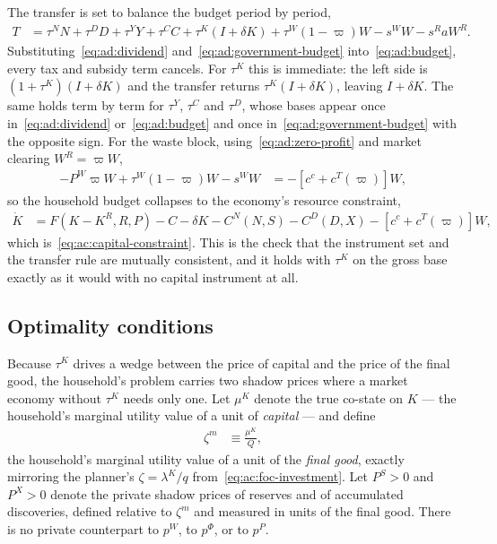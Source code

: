  The transfer is set to balance the budget period by period,
\begin{align}
T &= \tau^NN+\tau^DD+\tau^YY+\tau^CC+\tau^K\left(I+\delta K\right)+\tau^W(1-\varpi)W-s^WW-s^R aW^R.
\label{eq:ad:government-budget}
\end{align}
Substituting~\eqref{eq:ad:dividend} and~\eqref{eq:ad:government-budget} into~\eqref{eq:ad:budget}, every tax and subsidy term cancels. For $\tau^K$ this is immediate: the left side is $\left(1+\tau^K\right)\left(I+\delta K\right)$ and the transfer returns $\tau^K\left(I+\delta K\right)$, leaving $I+\delta K$. The same holds term by term for $\tau^Y$, $\tau^C$ and $\tau^D$, whose bases appear once in~\eqref{eq:ad:dividend} or~\eqref{eq:ad:budget} and once in~\eqref{eq:ad:government-budget} with the opposite sign. For the waste block, using~\eqref{eq:ad:zero-profit} and market clearing $W^R=\varpi W$,
\begin{align}
-P^W\varpi W+\tau^W(1-\varpi)W-s^WW &= -\left[c^c+c^T(\varpi)\right]W,
\label{eq:ad:waste-cancellation}
\end{align}
so the household budget collapses to the economy's resource constraint,
\begin{align}
\dot K &= F\!\left(K-K^R,R,P\right)-C-\delta K-C^N(N,S)-C^D(D,X)-\left[c^c+c^T(\varpi)\right]W,
\label{eq:ad:resource-constraint}
\end{align}
which is~\eqref{eq:ac:capital-constraint}. This is the check that the instrument set and the transfer rule are mutually consistent, and it holds with $\tau^K$ on the gross base exactly as it would with no capital instrument at all.

\subsection{Optimality conditions}
\label{subsec:ad:foc}

Because $\tau^K$ drives a wedge between the price of capital and the price of the final good, the household's problem carries two shadow prices where a market economy without $\tau^K$ needs only one. Let $\mu^K$ denote the true co-state on $K$ --- the household's marginal utility value of a unit of \emph{capital} --- and define
\begin{align}
\zeta^m &\equiv \frac{\mu^K}{Q},
\label{eq:ad:zetam}
\end{align}
the household's marginal utility value of a unit of the \emph{final good}, exactly mirroring the planner's $\zeta=\lambda^K/q$ from~\eqref{eq:ac:foc-investment}. Let $P^S>0$ and $P^X>0$ denote the private shadow prices of reserves and of accumulated discoveries, defined relative to $\zeta^m$ and measured in units of the final good. There is no private counterpart to $p^W$, to $p^\Phi$, or to $p^P$.

